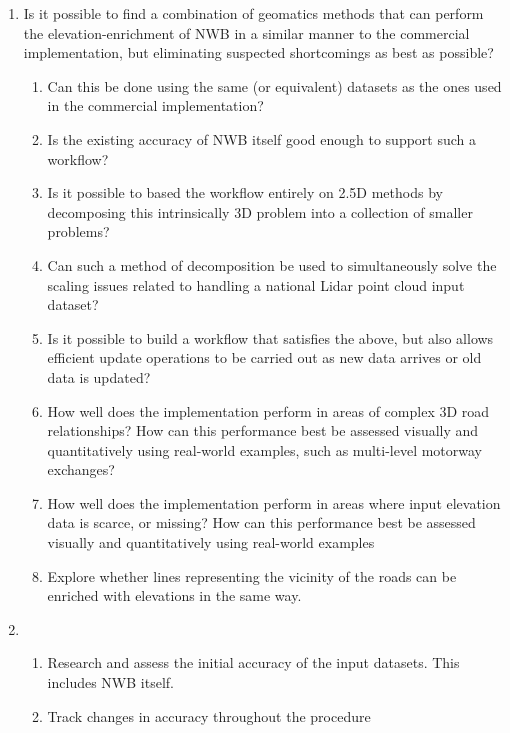 \begin{enumerate}
\item Is it possible to find a combination of geomatics methods that can perform the elevation-enrichment of NWB in a similar manner to the commercial implementation, but eliminating suspected shortcomings as best as possible?
\begin{enumerate}
    \item Can this be done using the same (or equivalent) datasets as the ones used in the commercial implementation?
    \item Is the existing accuracy of NWB itself good enough to support such a workflow?
    \item Is it possible to based the workflow entirely on 2.5D methods by decomposing this intrinsically 3D problem into a collection of smaller problems?
    \item Can such a method of decomposition be used to simultaneously solve the scaling issues related to handling a national Lidar point cloud input dataset?
    \item Is it possible to build a workflow that satisfies the above, but also allows efficient update operations to be carried out as new data arrives or old data is updated?
    \item How well does the implementation perform in areas of complex 3D road relationships? How can this performance best be assessed visually and quantitatively using real-world examples, such as multi-level motorway exchanges?
    \item How well does the implementation perform in areas where input elevation data is scarce, or missing? How can this performance best be assessed visually and quantitatively using real-world examples
    \item Explore whether lines representing the vicinity of the roads can be enriched with elevations in the same way.
\end{enumerate}
\item 
\begin{enumerate}
\item Research and assess the initial accuracy of the input datasets. This includes NWB itself.
\item Track changes in accuracy throughout the procedure
\end{enumerate}
\end{enumerate}